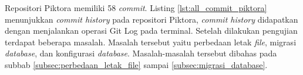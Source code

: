 
Repositori Piktora memiliki 58 \textit{commit}. Listing \ref{lst:all_commit_piktora} menunjukkan \textit{commit history} pada repositori Piktora, \textit{commit history} didapatkan dengan menjalankan operasi Git Log pada terminal. Setelah dilakukan pengujian terdapat beberapa masalah. Masalah tersebut yaitu perbedaan letak \textit{file}, migrasi \textit{database}, dan konfigurasi \textit{database}. Masalah-masalah tersebut dibahas pada subbab \ref{subsec:perbedaan_letak_file} sampai \ref{subsec:migrasi_database}.

